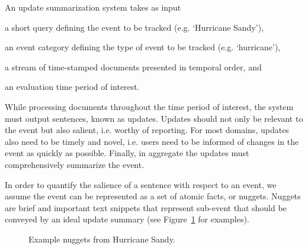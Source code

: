 
An update summarization system takes as input 
\begin{enumerate*}[label=\itshape\alph*\upshape)]
  \item a short query defining the event to be tracked (e.g. `Hurricane Sandy'), 
  \item an event category defining the type of event to be tracked (e.g. `hurricane'), 
  \item a stream of time-stamped documents %
  presented in temporal order, and \item an evaluation time period of interest.
      \end{enumerate*} While processing documents
      throughout the time period of interest, the system must output sentences,
      known as updates.
      Updates should not only be relevant to the event but also salient,
      i.e. worthy of
      reporting.
      For most domains, updates also need to be 
      timely and novel, i.e. users need to be informed of changes in the 
      event as quickly as possible.
      Finally, in aggregate the updates must comprehensively summarize the 
      event.

In order to quantify the salience of a sentence with respect to an event,
we assume the event can be represented as a set of atomic facts, or nuggets.
Nuggets are brief and important text snippets that represent sub-event that should be conveyed
by an ideal update summary (see Figure~\ref{fig:nuggets} for examples).
\setlength{\fboxsep}{10pt}
\begin{figure}
 \caption{Example nuggets from Hurricane Sandy.\label{fig:nuggets}}
\end{figure}

